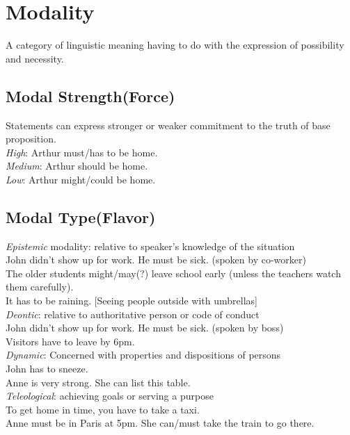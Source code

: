 \section{Modality}
A category of linguistic meaning having to do with the expression of possibility and necessity. 
\subsection*{Modal Strength(Force)}
Statements can express stronger or weaker commitment to the truth of base proposition. \\
\emph{High}: Arthur must/has to be home.\\
\emph{Medium}: Arthur should be home.\\
\emph{Low}: Arthur might/could be home.
\subsection*{Modal Type(Flavor)}
\emph{Epistemic} modality: relative to speaker's knowledge of the situation\\
John didn’t show up for work. He must be sick. (spoken by co-worker)\\
The older students might/may(?)
leave school early (unless the
teachers watch them carefully).\\
It has to be raining. [Seeing people outside with umbrellas]\\
\emph{Deontic}: relative to authoritative person or code of conduct\\
John didn’t show up for work. He must be sick. (spoken by boss) \\
Visitors have to leave by 6pm.\\
\emph{Dynamic}: Concerned with properties and dispositions of persons\\
John has to sneeze.\\
Anne is very strong. She can list this table. \\
\emph{Teleological}: achieving goals or serving a purpose\\
To get home in time, you have to take a taxi.\\
Anne must be in Paris at 5pm. She can/must take the train to go there.
